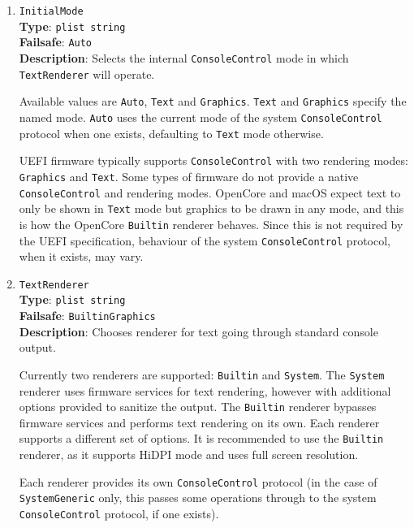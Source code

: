 \documentclass[]{article}
\begin{document}
\begin{enumerate}

\item
  \texttt{InitialMode}\\
  \textbf{Type}: \texttt{plist\ string}\\
  \textbf{Failsafe}: \texttt{Auto}\\
  \textbf{Description}: Selects the internal \texttt{ConsoleControl} mode in
  which \texttt{TextRenderer} will operate.

  Available values are \texttt{Auto}, \texttt{Text} and \texttt{Graphics}.
  \texttt{Text} and \texttt{Graphics} specify the named mode. \texttt{Auto}
  uses the current mode of the system \texttt{ConsoleControl} protocol when
  one exists, defaulting to \texttt{Text} mode otherwise.

  UEFI firmware typically supports \texttt{ConsoleControl} with two
  rendering modes: \texttt{Graphics} and \texttt{Text}. Some types of firmware
  do not provide a native \texttt{ConsoleControl} and rendering modes. OpenCore
  and macOS expect text to only be shown in \texttt{Text} mode but
  graphics to be drawn in any mode, and this is how the OpenCore \texttt{Builtin}
  renderer behaves. Since this is not required by the UEFI specification, behaviour
  of the system \texttt{ConsoleControl} protocol, when it exists, may vary.

\item
  \texttt{TextRenderer}\\
  \textbf{Type}: \texttt{plist\ string}\\
  \textbf{Failsafe}: \texttt{BuiltinGraphics}\\
  \textbf{Description}: Chooses renderer for text going through standard
  console output.

  Currently two renderers are supported: \texttt{Builtin} and
  \texttt{System}. The \texttt{System} renderer uses firmware services
  for text rendering, however with additional options provided to
  sanitize the output. The \texttt{Builtin} renderer bypasses firmware
  services and performs text rendering on its own. Each renderer
  supports a different set of options. It is recommended to use the
  \texttt{Builtin} renderer, as it supports HiDPI mode and uses
  full screen resolution.

  Each renderer provides its own \texttt{ConsoleControl} protocol
  (in the case of \texttt{SystemGeneric} only, this passes some
  operations through to the system \texttt{ConsoleControl} protocol,
  if one exists).


\end{enumerate}
\end{document}
